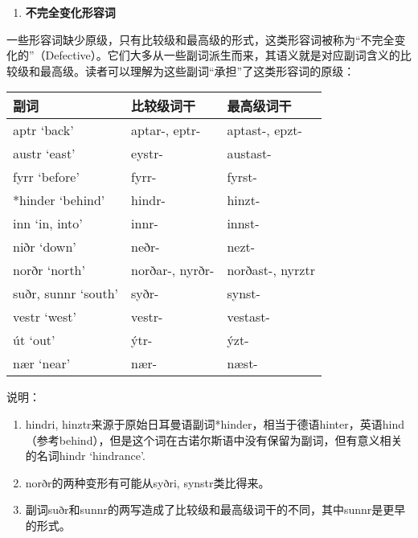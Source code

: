 \begin{enumerate}
  \def\labelenumi{\arabic{enumi})}
  \setcounter{enumi}{2}
  \item
        \textbf{不完全变化形容词}
\end{enumerate}

一些形容词缺少原级，只有比较级和最高级的形式，这类形容词被称为``不完全变化的''（Defective）。它们大多从一些副词派生而来，其语义就是对应副词含义的比较级和最高级。读者可以理解为这些副词``承担''了这类形容词的原级：

\begin{longtable}{lll}
  \toprule
  副词                & 比较级词干      & 最高级词干       \\
  \midrule
  \endhead
  \bottomrule
  \endfoot
  aptr `back'         & aptar-, eptr-   & aptast-, epzt-   \\
  austr `east‌'        & eystr-          & austast-         \\
  fyrr `before‌'       & fyrr-           & fyrst-           \\
  *hinder `behind'    & hindr-          & hinzt-           \\
  inn `in, into‌'      & innr-           & innst-           \\
  niðr `down'         & neðr-           & nezt-            \\
  norðr `north‌'       & norðar-, nyrðr- & norðast-, nyrztr \\
  suðr, sunnr `south' & syðr-           & synst-           \\
  vestr `west'        & vestr-          & vestast-         \\
  út `out'            & ýtr-            & ýzt-             \\
  nær `near'          & nær-            & næst-            \\
\end{longtable}

说明：

\begin{enumerate}
  \def\labelenumi{\arabic{enumi})}
  \item
        hindri,
        hinztr来源于原始日耳曼语副词*hinder，相当于德语hinter，英语hind（参考behind），但是这个词在古诺尔斯语中没有保留为副词，但有意义相关的名词hindr
        `hindrance'.
  \item
        norðr的两种变形有可能从syðri, synstr类比得来。
  \item
        副词suðr和sunnr的两写造成了比较级和最高级词干的不同，其中sunnr是更早的形式。
\end{enumerate}

